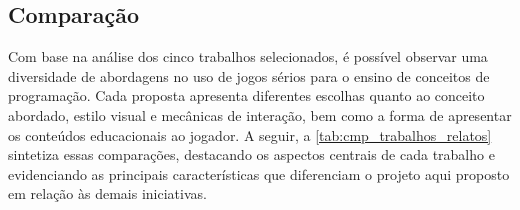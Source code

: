 \subsection{Comparação}

Com base na análise dos cinco trabalhos selecionados, é possível observar uma diversidade de abordagens no uso de jogos sérios para o ensino de conceitos de programação. Cada proposta apresenta diferentes escolhas quanto ao conceito abordado, estilo visual e mecânicas de interação, bem como a forma de apresentar os conteúdos educacionais ao jogador. A seguir, a \autoref{tab:cmp_trabalhos_relatos} sintetiza essas comparações, destacando os aspectos centrais de cada trabalho e evidenciando as principais características que diferenciam o projeto aqui proposto em relação às demais iniciativas.


